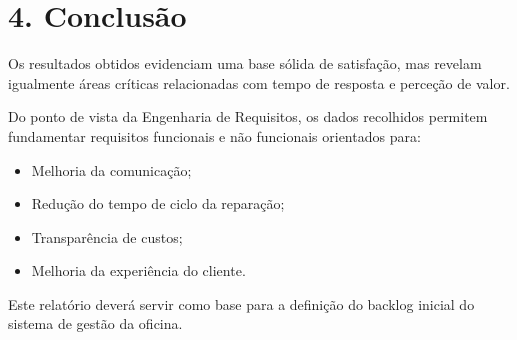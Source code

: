 \documentclass[11pt,a4paper]{article}
\begin{document}
\vspace{0.8cm}

\section*{4. Conclusão}

Os resultados obtidos evidenciam uma base sólida de satisfação, mas revelam igualmente áreas críticas relacionadas com tempo de resposta e perceção de valor.

Do ponto de vista da Engenharia de Requisitos, os dados recolhidos permitem fundamentar requisitos funcionais e não funcionais orientados para:

\begin{itemize}
	\item Melhoria da comunicação;
	\item Redução do tempo de ciclo da reparação;
	\item Transparência de custos;
	\item Melhoria da experiência do cliente.
\end{itemize}

Este relatório deverá servir como base para a definição do backlog inicial do sistema de gestão da oficina.
\end{document}

